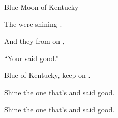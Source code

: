 \begin{SBSong}{Blue Moon of Kentucky}
\begin{SBChorus}
    The  were shining . 
    
    And they  from on , 
    
    ``Your   said good.'' 
    
    Blue  of Kentucky, keep on . 
    
    Shine  the one that's  and said good.
    
    Shine  the one that's  and said good.
  \end{SBChorus}
\end{SBSong}
